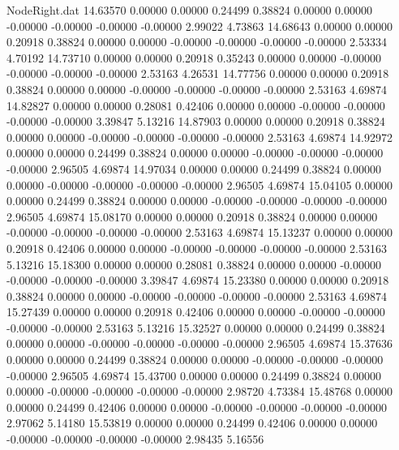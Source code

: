 \begin{filecontents}{NodeRight.dat}
  14.63570    0.00000    0.00000     0.24499    0.38824    0.00000    0.00000   -0.00000   -0.00000   -0.00000   -0.00000    2.99022    4.73863
  14.68643    0.00000    0.00000     0.20918    0.38824    0.00000    0.00000   -0.00000   -0.00000   -0.00000   -0.00000    2.53334    4.70192
  14.73710    0.00000    0.00000     0.20918    0.35243    0.00000    0.00000   -0.00000   -0.00000   -0.00000   -0.00000    2.53163    4.26531
  14.77756    0.00000    0.00000     0.20918    0.38824    0.00000    0.00000   -0.00000   -0.00000   -0.00000   -0.00000    2.53163    4.69874
  14.82827    0.00000    0.00000     0.28081    0.42406    0.00000    0.00000   -0.00000   -0.00000   -0.00000   -0.00000    3.39847    5.13216
  14.87903    0.00000    0.00000     0.20918    0.38824    0.00000    0.00000   -0.00000   -0.00000   -0.00000   -0.00000    2.53163    4.69874
  14.92972    0.00000    0.00000     0.24499    0.38824    0.00000    0.00000   -0.00000   -0.00000   -0.00000   -0.00000    2.96505    4.69874
  14.97034    0.00000    0.00000     0.24499    0.38824    0.00000    0.00000   -0.00000   -0.00000   -0.00000   -0.00000    2.96505    4.69874
  15.04105    0.00000    0.00000     0.24499    0.38824    0.00000    0.00000   -0.00000   -0.00000   -0.00000   -0.00000    2.96505    4.69874
  15.08170    0.00000    0.00000     0.20918    0.38824    0.00000    0.00000   -0.00000   -0.00000   -0.00000   -0.00000    2.53163    4.69874
  15.13237    0.00000    0.00000     0.20918    0.42406    0.00000    0.00000   -0.00000   -0.00000   -0.00000   -0.00000    2.53163    5.13216
  15.18300    0.00000    0.00000     0.28081    0.38824    0.00000    0.00000   -0.00000   -0.00000   -0.00000   -0.00000    3.39847    4.69874
  15.23380    0.00000    0.00000     0.20918    0.38824    0.00000    0.00000   -0.00000   -0.00000   -0.00000   -0.00000    2.53163    4.69874
  15.27439    0.00000    0.00000     0.20918    0.42406    0.00000    0.00000   -0.00000   -0.00000   -0.00000   -0.00000    2.53163    5.13216
  15.32527    0.00000    0.00000     0.24499    0.38824    0.00000    0.00000   -0.00000   -0.00000   -0.00000   -0.00000    2.96505    4.69874
  15.37636    0.00000    0.00000     0.24499    0.38824    0.00000    0.00000   -0.00000   -0.00000   -0.00000   -0.00000    2.96505    4.69874
  15.43700    0.00000    0.00000     0.24499    0.38824    0.00000    0.00000   -0.00000   -0.00000   -0.00000   -0.00000    2.98720    4.73384
  15.48768    0.00000    0.00000     0.24499    0.42406    0.00000    0.00000   -0.00000   -0.00000   -0.00000   -0.00000    2.97062    5.14180
  15.53819    0.00000    0.00000     0.24499    0.42406    0.00000    0.00000   -0.00000   -0.00000   -0.00000   -0.00000    2.98435    5.16556

\end{filecontents}

